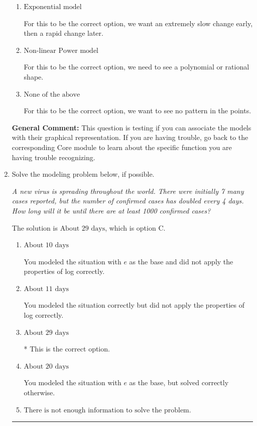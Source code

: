 \documentclass{extbook}[14pt]
\newcommand{\litem}[1]{\item #1

\rule{\textwidth}{0.4pt}}
\begin{document}
\begin{enumerate}
{\begin{enumerate}[label=\Alph*.]
For this to be the correct option, we need to see a mostly straight line of points.
\item \( \text{Exponential model} \)

For this to be the correct option, we want an extremely slow change early, then a rapid change later.
\item \( \text{Non-linear Power model} \)

For this to be the correct option, we need to see a polynomial or rational shape.
\item \( \text{None of the above} \)

For this to be the correct option, we want to see no pattern in the points.
\end{enumerate}

\textbf{General Comment:} This question is testing if you can associate the models with their graphical representation. If you are having trouble, go back to the corresponding Core module to learn about the specific function you are having trouble recognizing.
}
\litem{
Solve the modeling problem below, if possible.

\begin{center}
    \textit{ A new virus is spreading throughout the world. There were initially 7 many cases reported, but the number of confirmed cases has doubled every 4 days. How long will it be until there are at least 1000 confirmed cases? }
\end{center}


The solution is \( \text{About } 29 \text{ days} \), which is option C.\begin{enumerate}[label=\Alph*.]
\item \( \text{About } 10 \text{ days} \)

You modeled the situation with $e$ as the base and did not apply the properties of log correctly.
\item \( \text{About } 11 \text{ days} \)

You modeled the situation correctly but did not apply the properties of log correctly.
\item \( \text{About } 29 \text{ days} \)

* This is the correct option.
\item \( \text{About } 20 \text{ days} \)

You modeled the situation with $e$ as the base, but solved correctly otherwise.
\item \( \text{There is not enough information to solve the problem.} \)


\end{enumerate}}
\end{enumerate}
\end{document}

